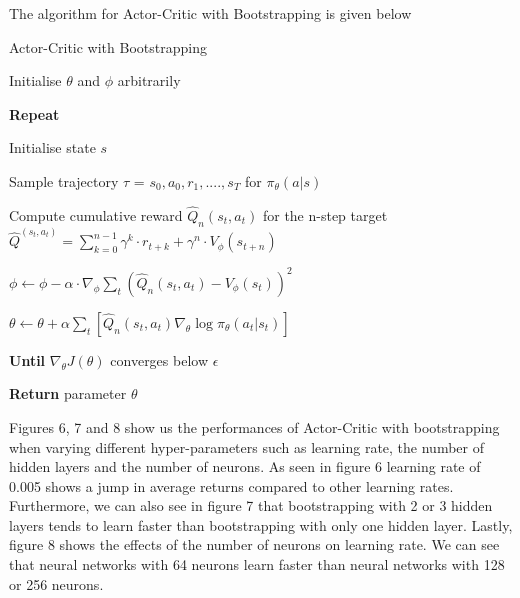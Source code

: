\documentclass{article}
\begin{document}
The algorithm for Actor-Critic with Bootstrapping is given below \cite{plaat-deeprl}
\begin{algorithm}[htbp]
\caption{Actor-Critic with Bootstrapping}
\SetAlgoLined
\DontPrintSemicolon
\small %
Initialise $\theta$ and $\phi$ arbitrarily\;\\
\item \textbf{Repeat} \;\\
{
    \item Initialise state $s$\;
    \item Sample trajectory $\tau$ = ${s_0,a_0,r_1,....,s_T}$ for $\pi_\theta(a|s)$
     \item 
    {
     \item Compute cumulative reward $\hat{Q}_n(s_t,a_t)$ for the n-step target
     \newline \(\hat{Q}^(s_t,a_t) = \sum_{k=0}^{n-1}\gamma^k\cdot r_{t+k} + \gamma^{n} \cdot V_\phi (s_{t+n})\)
    }
}
    \item $\phi \leftarrow \phi - \alpha \cdot \nabla_\phi \sum_t (\hat{Q}_n(s_t, a_t) - V_\phi(s_t))^2$ \;
    \item $\theta \leftarrow \theta + \alpha \sum_t [\hat{Q}_n(s_t, a_t) \nabla_\theta \log \pi_\theta(a_t | s_t)]$\;
\item \textbf{Until} $\nabla_\theta J(\theta)$ converges below $\epsilon$ \;
\item \textbf{Return} parameter $\theta$
\end{algorithm}

Figures 6, 7 and 8 show us the performances of Actor-Critic with bootstrapping when varying different hyper-parameters such as learning rate, the number of hidden layers and the number of neurons. \newline 
As seen in figure 6 learning rate of 0.005 shows a jump in average returns compared to other learning rates. Furthermore, we can also see in figure 7 that bootstrapping with 2 or 3 hidden layers tends to learn faster than bootstrapping with only one hidden layer. Lastly, figure 8 shows the effects of the number of neurons on learning rate. We can see that neural networks with 64 neurons learn faster than neural networks with 128 or 256 neurons. 
\end{document}

